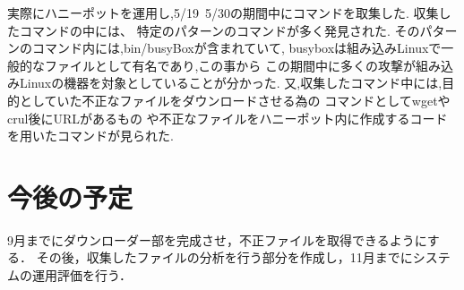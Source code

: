 \documentclass{entry}
\begin{document}
実際にハニーポットを運用し,5/19~5/30の期間中にコマンドを取集した.
収集したコマンドの中には、
特定のパターンのコマンドが多く発見された.
そのパターンのコマンド内には,bin/busyBoxが含まれていて,
busyboxは組み込みLinuxで一般的なファイルとして有名であり,この事から
この期間中に多くの攻撃が組み込みLinuxの機器を対象としていることが分かった.
又,収集したコマンド中には,目的としていた不正なファイルをダウンロードさせる為の
コマンドとしてwgetやcrul後にURLがあるもの
や不正なファイルをハニーポット内に作成するコードを用いたコマンドが見られた.


\section{今後の予定}

9月までにダウンローダー部を完成させ，不正ファイルを取得できるようにする．
その後，収集したファイルの分析を行う部分を作成し，11月までにシステムの運用評価を行う．



%

\end{document}
